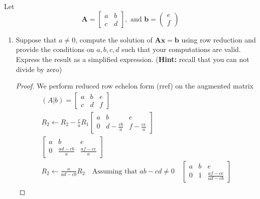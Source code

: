 \documentclass[11pt]{scrartcl}
\begin{document}
\section{}
Let
\begin{equation}
	\mathbf{A} = \left [ \begin{array}{cc}
			a & b \\
			c & d
		\end{array} \right ],
	\mbox{ and  } \mathbf{b} = \left ( \begin{array}{c}
			e \\
			f
		\end{array} \right )
\end{equation}
\begin{enumerate}[label=\alph*.]
	\item{
	      Suppose that $a\neq 0 $, compute the solution of $\mathbf{Ax = b}$
	      using row reduction and provide the conditions on $a,b,c,d$ such that your computations are valid.
	      Express the result as a simplified expression. (\textbf{Hint:} recall that you can not divide by zero)
	      \begin{proof}
		      We perform reduced row echelon form (rref) on the augmented matrix
		      \begin{align*}
			      (A|b)=
			      \left[\begin{array}{cc|c}
					      a & b & e \\
					      c & d & f
				      \end{array}\right] \\
			      R_2 \leftarrow R_2 - \frac{c}{a} R_1
			      \left[\begin{array}{cc|c}
					      a & b                & e                \\
					      0 & d - \frac{cb}{a} & f - \frac{ce}{a}
				      \end{array}\right] \\
			      \left[\begin{array}{cc|c}
					      a & b               & e               \\
					      0 & \frac{ad-cb}{a} & \frac{af-ce}{a}
				      \end{array}\right] \\
			      R_2 \leftarrow \frac{a}{ad-cb}R_2 \quad \text{Assuming that $ab-cd \neq 0$} \quad
			      \left[\begin{array}{cc|c}
					      a & b & e                   \\
					      0 & 1 & \frac{af-ce}{ad-cb}
				      \end{array}\right] \\

\end{align*}
\end{proof}}
\end{enumerate}
\end{document}
